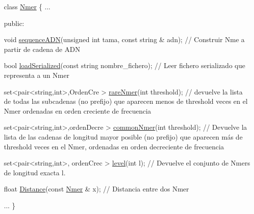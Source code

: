 \begin{DoxyCode}
\textcolor{keyword}{class }\hyperlink{classNmer}{Nmer} \{
  ...

  \textcolor{keyword}{public}:

   \textcolor{keywordtype}{void} \hyperlink{classNmer_ae8871242f0e282d71e4c9b4685f468be}{sequenceADN}(\textcolor{keywordtype}{unsigned} \textcolor{keywordtype}{int} tama, \textcolor{keyword}{const} \textcolor{keywordtype}{string} & adn);  \textcolor{comment}{// Construir Nme a partir de cadena
       de ADN}

   \textcolor{keywordtype}{bool} \hyperlink{classNmer_a418c016bb6e04d2f699ddb694ee0221f}{loadSerialized}(\textcolor{keyword}{const} \textcolor{keywordtype}{string} nombre\_fichero); \textcolor{comment}{// Leer fichero serializado que
       representa a un Nmer }

   set<pair<string,int>,OrdenCre > \hyperlink{classNmer_ac878556843a4b401b4be0e1be6747e45}{rareNmer}(\textcolor{keywordtype}{int} threshold); \textcolor{comment}{// devuelve la lista de todas las
       subcadenas (no prefijo) que  aparecen menos de threshold veces en el Nmer ordenadas en orden creciente de
       frecuencia}

   set<pair<string,int>,ordenDecre > \hyperlink{classNmer_aaf801908e364dd05d7cc33c81d944b0a}{commonNmer}(\textcolor{keywordtype}{int} threshold); \textcolor{comment}{// Devuelve la lista de las
       cadenas de longitud mayor posible (no prefijo)  que aparecen más de threshold veces en el Nmer, ordenadas en
       orden decreciente de frecuencia}
  
   set<pair<string,int>, ordenCrec > \hyperlink{classNmer_a38059ff69b4934e18a5c467338179761}{level}(\textcolor{keywordtype}{int} l); \textcolor{comment}{// Devuelve el conjunto de Nmers de longitud exacta
       l.}

   \textcolor{keywordtype}{float}  \hyperlink{classNmer_a8df2f2f355423b02413e5e29dc5639e8}{Distance}(\textcolor{keyword}{const} \hyperlink{classNmer}{Nmer} & x);  \textcolor{comment}{// Distancia entre  dos Nmer}

  ...
\}
\end{DoxyCode}


